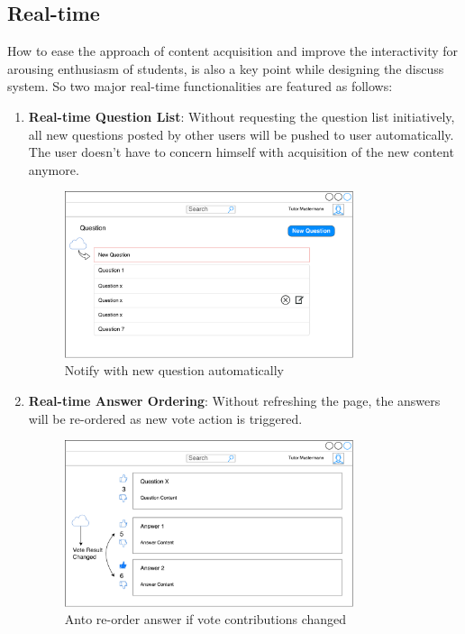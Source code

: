 \subsection{Real-time}
How to ease the approach of content acquisition and improve the interactivity for arousing enthusiasm of students, is also a key point while designing the discuss system. So two major real-time functionalities are featured as follows: 


\begin{enumerate}
\item
\textbf{Real-time Question List}: Without requesting the question list initiatively, all new questions posted by other users will be pushed to user automatically. The user doesn't have to concern himself with acquisition of the new content anymore.

\begin{figure}[!htbp]
  \centering
    \includegraphics[width=0.8\textwidth]{Figures/mockup/question-notify.pdf}
  \caption{Notify with new question automatically}
\end{figure}

\item
\textbf{Real-time Answer Ordering}: Without refreshing the page, the answers will be re-ordered as new vote action is triggered.

\begin{figure}[!htbp]
  \centering
    \includegraphics[width=0.8\textwidth]{Figures/mockup/votechange.pdf}
  \caption{Anto re-order answer if vote contributions changed}
\end{figure}


\end{enumerate}
